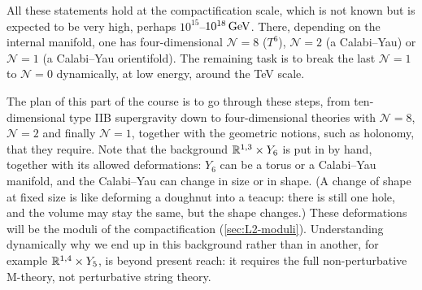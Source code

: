 All these statements hold at the compactification scale, which is not known but is expected to be very high, perhaps $10^{15}$--$10^{18}\,\mathrm{GeV}$. There, depending on the internal manifold, one has four-dimensional $\mathcal N=8$ ($T^6$), $\mathcal N=2$ (a Calabi--Yau) or $\mathcal N=1$ (a Calabi--Yau orientifold). The remaining task is to break the last $\mathcal N=1$ to $\mathcal N=0$ dynamically, at low energy, around the TeV scale.

The plan of this part of the course is to go through these steps, from ten-dimensional type IIB supergravity down to four-dimensional theories with $\mathcal N=8$, $\mathcal N=2$ and finally $\mathcal N=1$, together with the geometric notions, such as holonomy, that they require. Note that the background $\mathbb{R}^{1,3}\times Y_6$ is put in by hand, together with its allowed deformations: $Y_6$ can be a torus or a Calabi--Yau manifold, and the Calabi--Yau can change in size or in shape. (A change of shape at fixed size is like deforming a doughnut into a teacup: there is still one hole, and the volume may stay the same, but the shape changes.) These deformations will be the moduli of the compactification (\cref{sec:L2-moduli}). Understanding dynamically why we end up in this background rather than in another, for example $\mathbb{R}^{1,4}\times Y_5$, is beyond present reach: it requires the full non-perturbative M-theory, not perturbative string theory.
